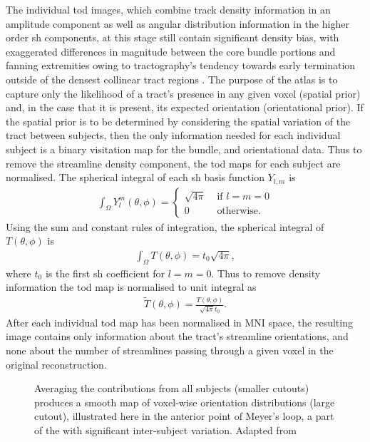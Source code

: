 \documentclass[12pt,phd,a4paper,twoside]{ucl_thesis}
\renewcommand{\textcite}[2][]{
\ifthenelse { \equal {#1} {} }  {\citeauthor{#2}\autocite{#2}}   {\citeauthor{#1}\autocite{#2}}}
\begin{document}
The individual \gls{tod} images, which combine track density information in an amplitude component as well as angular distribution information in the higher order \gls{sh} components, at this stage still contain significant density bias, with exaggerated differences in magnitude between the core bundle portions and fanning extremities owing to tractography's tendency towards early termination outside of the densest collinear tract regions \autocite{Smith2013,Calamante2015,Rheault2020}.
The purpose of the atlas is to capture only the likelihood of a tract's presence in any given voxel (spatial prior) and, in the case that it is present, its expected orientation (orientational prior).
If the spatial prior is to be determined by considering the spatial variation of the tract between subjects, then the only information needed for each individual subject is a binary visitation map for the bundle, and orientational data.
Thus to remove the streamline density component, the \gls{tod} maps for each subject are normalised.
The spherical integral of each \gls{sh} basis function $Y_{l,m}$ is
\begin{align}
  \int_{\Omega} Y^m_l(\theta, \phi) = \begin{cases}
   \sqrt{4\pi} & \text{ if } l=m=0\\
   0 & \text{ otherwise. }
  \end{cases}
\end{align}
Using the sum and constant rules of integration, the spherical integral of $T(\theta,\phi)$ is
\begin{align}
  \int_{\Omega} T(\theta,\phi) = t_0 \sqrt{4\pi},
\end{align}
where $t_0$ is the first \gls{sh} coefficient for $l=m=0$. Thus to remove density information the \gls{tod} map is normalised to unit integral as
\begin{align}
  \widetilde{T}(\theta, \phi) = \frac{T(\theta,\phi)}{\sqrt{4\pi} t_0}.
\end{align}
After each individual \gls{tod} map has been normalised in MNI space, the resulting image contains only information about the tract's streamline orientations, and none about the number of streamlines passing through a given voxel in the original reconstruction.

\begin{SCfigure}
  
  \caption[TOD averaging to create and atlas]{Averaging the  contributions from all subjects (smaller cutouts) produces a smooth map of voxel-wise orientation distributions (large cutout), illustrated here in the anterior point of Meyer's loop, a part of the  with significant inter-subject variation. Adapted from \textcite{Young2024}}
  \label{fig:todmean}
\end{SCfigure}
\end{document}
